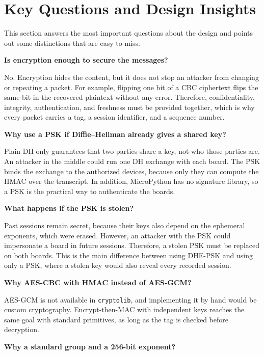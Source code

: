 \documentclass[11pt,a4paper]{article}
\begin{document}

\section{Key Questions and Design Insights}

This section answers the most important questions about the design and points
out some distinctions that are easy to miss.

\textbf{Is encryption enough to secure the messages?}

No. Encryption hides the content, but it does not stop an attacker from changing or repeating a
packet. For example, flipping one bit of a CBC ciphertext flips the same bit in
the recovered plaintext without any error. Therefore, confidentiality,
integrity, authentication, and freshness must be provided together, which is
why every packet carries a tag, a session identifier, and a sequence number.

\textbf{Why use a PSK if Diffie--Hellman already gives a shared key?} 

Plain DH only guarantees that two parties share a key, not who those parties are. An
attacker in the middle could run one DH exchange with each board. The PSK binds
the exchange to the authorized devices, because only they can compute the HMAC
over the transcript. In addition, MicroPython has no signature library, so a
PSK is the practical way to authenticate the boards.

\textbf{What happens if the PSK is stolen?} 

Past sessions remain secret, because their keys also depend on the ephemeral exponents, which were erased.
However, an attacker with the PSK could impersonate a board in future sessions.
Therefore, a stolen PSK must be replaced on both boards. This is the main
difference between using DHE-PSK and using only a PSK, where a stolen key
would also reveal every recorded session.

\textbf{Why AES-CBC with HMAC instead of AES-GCM?} 

AES-GCM is not available in \texttt{cryptolib}, and implementing it by hand would be custom
cryptography. Encrypt-then-MAC with independent keys reaches the same goal with
standard primitives, as long as the tag is checked before decryption.

\textbf{Why a standard group and a 256-bit exponent?} 
\end{document}

